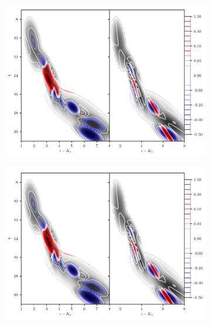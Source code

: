\begin{figure}[ht!]
\begin{center}
\begin{subfigure}[t]{0.47\textwidth}
\includegraphics[page=1,width=\textwidth]{./background/Figures/validationMissing.pdf}
\end{subfigure}
\begin{subfigure}[t]{0.47\textwidth}
\includegraphics[page=2,width=\textwidth]{./background/Figures/validationMissing.pdf}
\end{subfigure}
\begin{subfigure}[t]{0.47\textwidth}

\end{subfigure}
\end{center}
\end{figure}
